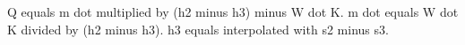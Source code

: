 Q equals m dot multiplied by (h2 minus h3) minus W dot K.  
m dot equals W dot K divided by (h2 minus h3).  
h3 equals interpolated with s2 minus s3.